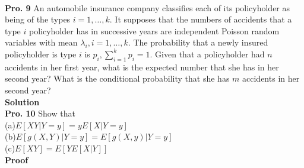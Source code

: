 \documentclass[12pt,onecolumn,journal]{IEEEtran}
\begin{document}
\\
\textbf{Pro. 9} An automobile insurance company classifies each of its policyholder as being of the types $i=1,\ldots,k$. It supposes that the numbers of accidents that a type $i$ policyholder has in successive years are independent Poisson random variables with mean $\lambda_i,i=1,\ldots,k$. The probability that a newly insured policyholder is type $i$ is $p_i,\sum^k_{i=1}{p_i}=1$. Given that a policyholder had $n$ accidents in her first year, what is the expected number that she has in her second year? What is the conditional probability that she has $m$ accidents in her second year?\\
\textbf{Solution}
\\
\textbf{Pro. 10} Show that\\
\quad\quad(a)$E[XY|Y=y]=yE[X|Y=y]$\\
\quad\quad(b)$ E[g(X,Y)|Y=y]=E[g(X,y)|Y=y]$\\
\quad\quad(c)$ E[XY]=E[YE[X|Y]]$\\
\textbf{Proof}
\end{document}
